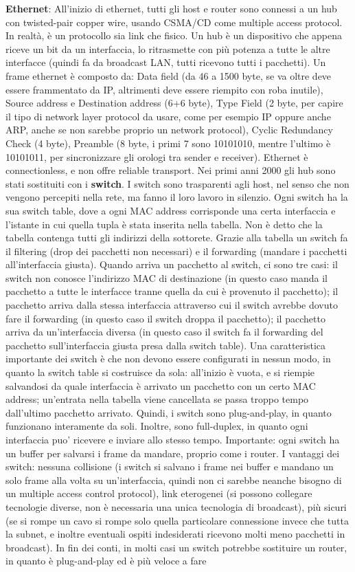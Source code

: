 \documentclass[a4paper,10pt]{article} %
\renewcommand{\b}[1]{%
    {\textbf{#1}}}
\begin{document}
\b{Ethernet}: All'inizio di ethernet, tutti gli host e router sono connessi a un hub con twisted-pair copper wire, usando CSMA/CD come multiple access protocol. In realtà, è un protocollo sia link che fisico. Un hub è un dispositivo che appena riceve un bit da un interfaccia, lo ritrasmette con più potenza a tutte le altre interfacce (quindi fa da broadcast LAN, tutti ricevono tutti i pacchetti). Un frame ethernet è composto da: Data field (da 46 a 1500 byte, se va oltre deve essere frammentato da IP, altrimenti deve essere riempito con roba inutile), Source address e Destination address (6+6 byte), Type Field (2 byte, per capire il tipo di network layer protocol da usare, come per esempio IP oppure anche ARP, anche se non sarebbe proprio un network protocol), Cyclic Redundancy Check (4 byte), Preamble (8 byte, i primi 7 sono 10101010, mentre l'ultimo è 10101011, per sincronizzare gli orologi tra sender e receiver). Ethernet è connectionless, e non offre reliable transport. Nei primi anni 2000 gli hub sono stati sostituiti con i \b{switch}. I switch sono trasparenti agli host, nel senso che non vengono percepiti nella rete, ma fanno il loro lavoro in silenzio. Ogni switch ha la sua switch table, dove a ogni MAC address corrisponde una certa interfaccia e l'istante in cui quella tupla è stata inserita nella tabella. Non è detto che la tabella contenga tutti gli indirizzi della sottorete. Grazie alla tabella un switch fa il filtering (drop dei pacchetti non necessari) e il forwarding (mandare i pacchetti all'interfaccia giusta). Quando arriva un pacchetto al switch, ci sono tre casi: il switch non conosce l'indirizzo MAC di destinazione (in questo caso manda il pacchetto a tutte le interfacce tranne quella da cui è provenuto il pacchetto); il pacchetto arriva dalla stessa interfaccia attraverso cui il switch avrebbe dovuto fare il forwarding (in questo caso il switch droppa il pacchetto); il pacchetto arriva da un'interfaccia diversa (in questo caso il switch fa il forwarding del pacchetto sull'interfaccia giusta presa dalla switch table). Una caratteristica importante dei switch è che non devono essere configurati in nessun modo, in quanto la switch table si costruisce da sola: all'inizio è vuota, e si riempie salvandosi da quale interfaccia è arrivato un pacchetto con un certo MAC address; un'entrata nella tabella viene cancellata se passa troppo tempo dall'ultimo pacchetto arrivato. Quindi, i switch sono plug-and-play, in quanto funzionano interamente da soli. Inoltre, sono full-duplex, in quanto ogni interfaccia puo' ricevere e inviare allo stesso tempo. Importante: ogni switch ha un buffer per salvarsi i frame da mandare, proprio come i router. I vantaggi dei switch: nessuna collisione (i switch si salvano i frame nei buffer e mandano un solo frame alla volta su un'interfaccia, quindi non ci sarebbe neanche bisogno di un multiple access control protocol), link eterogenei (si possono collegare tecnologie diverse, non è necessaria una unica tecnologia di broadcast), più sicuri (se si rompe un cavo si rompe solo quella particolare connessione invece che tutta la subnet, e inoltre eventuali ospiti indesiderati ricevono molti meno pacchetti in broadcast). In fin dei conti, in molti casi un switch potrebbe sostituire un router, in quanto è plug-and-play ed è più veloce a fare 
\end{document}

